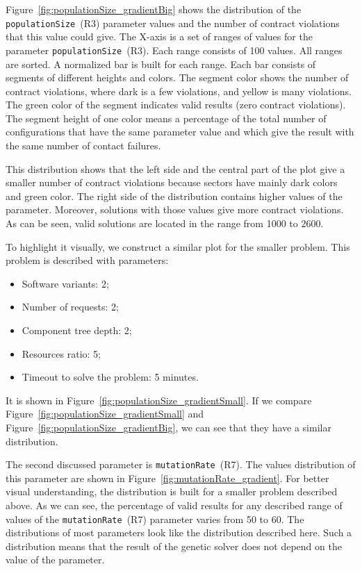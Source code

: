 Figure~\ref{fig:populationSize_gradientBig} shows the distribution of the \texttt{populationSize}~(R3) parameter values and the number of contract violations that this value could give. The X-axis is a set of ranges of values for the parameter \texttt{populationSize}~(R3). Each range consists of 100 values. All ranges are sorted. A normalized bar is built for each range. Each bar consists of segments of different heights and colors. The segment color shows the number of contract violations, where dark is a few violations, and yellow is many violations. The green color of the segment indicates valid results (zero contract violations). The segment height of one color means a percentage of the total number of configurations that have the same parameter value and which give the result with the same number of contact failures.

This distribution shows that the left side and the central part of the plot give a smaller number of contract violations because sectors have mainly dark colors and green color. The right side of the distribution contains higher values of the parameter. Moreover, solutions with those values give more contract violations. As can be seen, valid solutions are located in the range from 1000 to 2600.

To highlight it visually, we construct a similar plot for the smaller problem. This problem is described with parameters:
\begin{itemize}
	\item Software variants: 2;
	\item Number of requests: 2;
	\item Component tree depth: 2;
	\item Resources ratio: 5;
	\item Timeout to solve the problem: 5 minutes.
\end{itemize}

It is shown in Figure~\ref{fig:populationSize_gradientSmall}. If we compare Figure~\ref{fig:populationSize_gradientSmall} and Figure~\ref{fig:populationSize_gradientBig}, we can see that they have a similar distribution.

The second  discussed parameter is \texttt{mutationRate}~(R7). The values distribution of this parameter are shown in Figure~\ref{fig:mutationRate_gradient}. For better visual understanding, the distribution is built for a smaller problem described above. 
As we can see, the percentage of valid results for any described range of values of the \texttt{mutationRate}~(R7) parameter varies from 50 to 60. The distributions of most parameters look like the distribution described here. Such a distribution means that the result of the genetic solver does not depend on the value of the parameter. 

